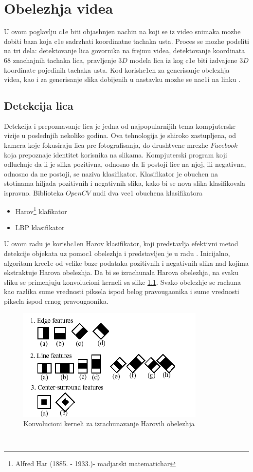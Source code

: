 \documentclass[a4paper, openany, oneside, 11pt]{book}
\begin{document}
\chapter{Obelezhja videa}
U ovom poglavlju c1e biti objashnjen nachin na koji se iz video snimaka mozhe dobiti baza koja c1e sadrzhati koordinatne tachaka usta. Proces se mozhe podeliti na tri dela: detektovanje lica govornika na frejmu videa, detektovanje koordinata 68 znachajnih tachaka lica, pravljenje $3D$ modela lica iz kog c1e biti izdvajene $3D$ koordinate pojedinih tachaka usta. Kod korish\-c1en za generisanje obelezhja videa, kao i za generisanje slika dobijenih u nastavku mozhe se nac1i na linku \cite{gh1}.
\section{Detekcija lica}\label{detekcijalica}
Detekcija i prepoznavanje lica je jedna od najpopularnijih tema kompjuterske vizije u poslednjih nekoliko godina. Ova tehnologija je shiroko zastupljena, od kamera koje fokusiraju lica pre fotografisanja, do drushtvene mrezhe $Facebook$ koja prepoznaje identitet korisnika na slikama. Kompjuterski program koji odlu\-chuje da li je slika pozitivna, odnosno da li postoji lice na njoj, ili negativna, odnosno da ne postoji, se naziva klasifikator. Klasifikator je obuchen na stotinama hiljada pozitivnih i negativnih slika, kako bi se nova slika klasifikovala ispravno. Biblioteka $OpenCV$ \cite{Opencv} nudi dva vec1 obuchena klasifikatora
\begin{itemize}
\item Harov\footnote{Alfred Har (1885. - 1933.)- madjarski matematichar } klafikator
\item \acrshort{LBP} klasifikator
\end{itemize}
U ovom radu je korish\-c1en Harov klasifikator, koji predstavlja efektivni metod detekcije objekata uz pomoc1 obelezhja i predstavljen je u radu \cite{Haar}. Inicijalno, algoritam krec1e od velike baze podataka pozitivnih i negativnih slika nad kojima ekstraktuje Harova obelezhja. Da bi se izrachunala Harova obelezhja, na svaku sliku se primenjuju konvolucioni kerneli sa slike \ref{fig:2_1}. Svako obelezhje se rachuna kao razlika sume vrednosti piksela ispod belog pravougaonika i sume vrednosti piksela ispod crnog pravougaonika.
\begin{figure}[h!]
\centering
  \includegraphics[scale=0.4]{res/haar_kernels.png}
  \caption{Konvolucioni kerneli za izrachunavanje Harovih obelezhja\protect\footnotemark}
  \label{fig:2_1}
  \vspace{0pt}
\end{figure}\\
\end{document}
